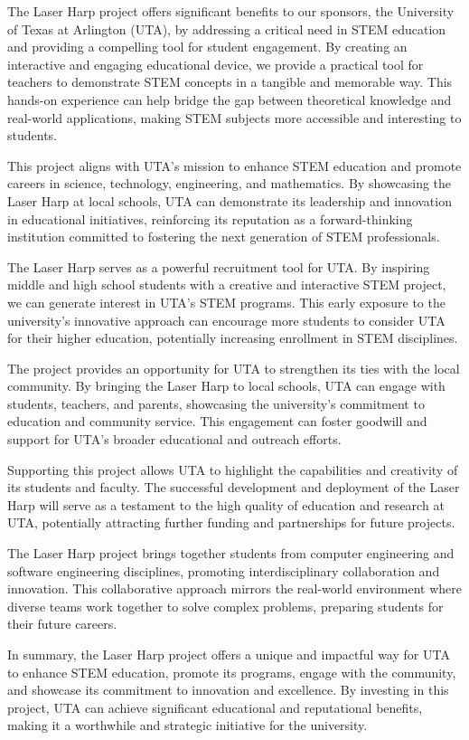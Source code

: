 The Laser Harp project offers significant benefits to our sponsors, the University of Texas at Arlington (UTA), by addressing a critical need in STEM education and providing a compelling tool for student engagement. By creating an interactive and engaging educational device, we provide a practical tool for teachers to demonstrate STEM concepts in a tangible and memorable way. This hands-on experience can help bridge the gap between theoretical knowledge and real-world applications, making STEM subjects more accessible and interesting to students.

This project aligns with UTA's mission to enhance STEM education and promote careers in science, technology, engineering, and mathematics. By showcasing the Laser Harp at local schools, UTA can demonstrate its leadership and innovation in educational initiatives, reinforcing its reputation as a forward-thinking institution committed to fostering the next generation of STEM professionals.

The Laser Harp serves as a powerful recruitment tool for UTA. By inspiring middle and high school students with a creative and interactive STEM project, we can generate interest in UTA's STEM programs. This early exposure to the university's innovative approach can encourage more students to consider UTA for their higher education, potentially increasing enrollment in STEM disciplines.

The project provides an opportunity for UTA to strengthen its ties with the local community. By bringing the Laser Harp to local schools, UTA can engage with students, teachers, and parents, showcasing the university's commitment to education and community service. This engagement can foster goodwill and support for UTA's broader educational and outreach efforts.

Supporting this project allows UTA to highlight the capabilities and creativity of its students and faculty. The successful development and deployment of the Laser Harp will serve as a testament to the high quality of education and research at UTA, potentially attracting further funding and partnerships for future projects.

The Laser Harp project brings together students from computer engineering and software engineering disciplines, promoting interdisciplinary collaboration and innovation. This collaborative approach mirrors the real-world environment where diverse teams work together to solve complex problems, preparing students for their future careers.

In summary, the Laser Harp project offers a unique and impactful way for UTA to enhance STEM education, promote its programs, engage with the community, and showcase its commitment to innovation and excellence. By investing in this project, UTA can achieve significant educational and reputational benefits, making it a worthwhile and strategic initiative for the university.
